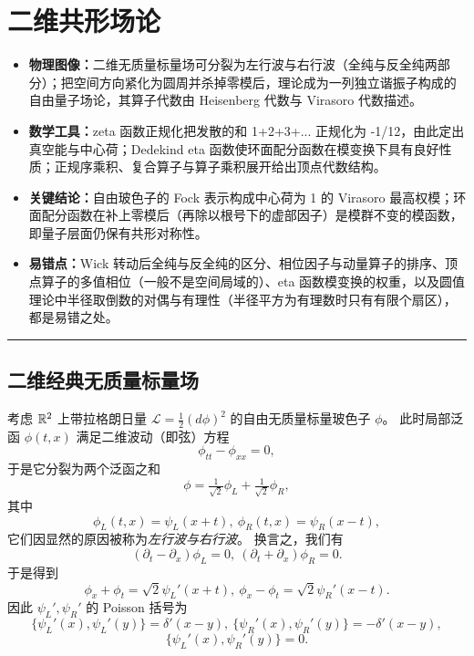 \section{二维共形场论}

\begin{keytakeaways}
\begin{itemize}
  \item \textbf{物理图像：}二维无质量标量场可分裂为左行波与右行波（全纯与反全纯两部分）；把空间方向紧化为圆周并杀掉零模后，理论成为一列独立谐振子构成的自由量子场论，其算子代数由 Heisenberg 代数与 Virasoro 代数描述。
  \item \textbf{数学工具：}zeta 函数正规化把发散的和 1+2+3+... 正规化为 -1/12，由此定出真空能与中心荷；Dedekind eta 函数使环面配分函数在模变换下具有良好性质；正规序乘积、复合算子与算子乘积展开给出顶点代数结构。
  \item \textbf{关键结论：}自由玻色子的 Fock 表示构成中心荷为 1 的 Virasoro 最高权模；环面配分函数在补上零模后（再除以根号下的虚部因子）是模群不变的模函数，即量子层面仍保有共形对称性。
  \item \textbf{易错点：}Wick 转动后全纯与反全纯的区分、相位因子与动量算子的排序、顶点算子的多值相位（一般不是空间局域的）、eta 函数模变换的权重，以及圆值理论中半径取倒数的对偶与有理性（半径平方为有理数时只有有限个扇区），都是易错之处。
\end{itemize}
\end{keytakeaways}

\bigskip
\noindent\rule{\textwidth}{0.6pt}
\bigskip

\subsection{二维经典无质量标量场} \label{mlsb}
考虑 $\Bbb R^2$ 上带拉格朗日量 $\mathcal L=\frac{1}{2}(d\phi)^2$ 的自由无质量标量玻色子 $\phi$。
此时局部泛函 $\phi(t,x)$ 满足二维波动（即弦）方程
$$
\phi_{tt}-\phi_{xx}=0, 
$$
于是它分裂为两个泛函之和
$$
\phi=\tfrac{1}{\sqrt{2}}\phi_L+\tfrac{1}{\sqrt{2}}\phi_R,
$$
其中
$$
\phi_L(t,x)=\psi_L(x+t),\ \phi_R(t,x)=\psi_R(x-t),
$$
它们因显然的原因被称为\emph{左行波与右行波}。
换言之，我们有
$$
(\partial_t-\partial_x)\phi_L=0,\ (\partial_t+\partial_x)\phi_R=0.
$$
于是得到
$$
\phi_x+\phi_t=\sqrt{2}\psi_L'(x+t),\ \phi_x-\phi_t=\sqrt{2}\psi_R'(x-t). 
$$
因此 $\psi_L',\psi_R'$ 的 Poisson 括号为
$$
\lbrace \psi_L'(x),\psi_L'(y)\rbrace=\delta'(x-y),\ \lbrace \psi_R'(x),\psi_R'(y)\rbrace=-\delta'(x-y),
$$
$$
\lbrace\psi_L'(x),\psi_R'(y)\rbrace=0.
$$

